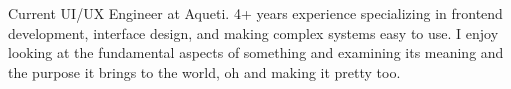 

\begin{cvparagraph}

Current UI/UX Engineer at Aqueti. 4+ years experience specializing in frontend development, interface design, and making complex systems easy to use. I enjoy looking at the fundamental aspects of something and examining its meaning and the purpose it brings to the world, oh and making it pretty too.
\end{cvparagraph}
